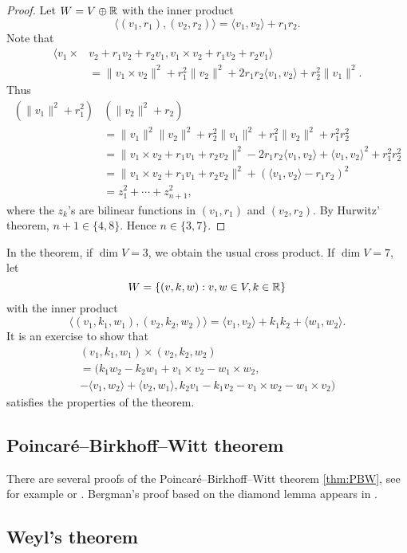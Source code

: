 \begin{proof}
	Let $W=V\oplus\mathbb{R}$ with the inner product  
	\[
		\langle (v_1,r_1),(v_2,r_2)\rangle = \langle v_1,v_2\rangle+r_1r_2.
	\]
	Note that
	\begin{align*}
		\langle v_1\times &v_2+r_1v_2+r_2v_1,v_1\times v_2+r_1v_2+r_2v_1\rangle\\
		&=\|v_1\times v_2\|^2+r_1^2\|v_2\|^2+2r_1r_2\langle v_1,v_2\rangle+r_2^2\|v_1\|^2.
	\end{align*}
	Thus  
	\begin{align*}
		(\|v_1\|^2+r_1^2)&(\|v_2\|^2+r_2)\\
		&= \|v_1\|^2\|v_2\|^2+r_2^2\|v_1\|^2+r_1^2\|v_2\|^2+r_1^2r_2^2\\
		&=\|v_1\times v_2+r_1v_1+r_2v_2\|^2-2r_1r_2\langle v_1,v_2\rangle+\langle v_1,v_2\rangle^2+r_1^2r_2^2\\
		&=\|v_1\times v_2+r_1v_1+r_2v_2\|^2+(\langle v_1,v_2\rangle-r_1r_2)^2\\
		&=z_1^2+\cdots+z_{n+1}^2,
	\end{align*}
	where the $z_k$'s are bilinear functions in $(v_1,r_1)$ and $(v_2,r_2)$. 
	By Hurwitz' theorem, 
	$n+1\in\{4,8\}$. Hence $n\in\{3,7\}$.
\end{proof}

In the theorem, if $\dim V=3$, we obtain the usual cross product. 
If $\dim V=7$, let 
\[
	W=\{(v,k,w):v,w\in V,k\in\mathbb{R}\}
\]
with the inner product 
\[
	\langle (v_1,k_1,w_1),(v_2,k_2,w_2)\rangle = \langle v_1,v_2\rangle+k_1k_2+\langle w_1,w_2\rangle.
\]
It is an exercise to show that 
\begin{multline*}
	(v_1,k_1,w_1)\times (v_2,k_2,w_2)\\
	=(k_1w_2-k_2w_1+v_1\times v_2-w_1\times w_2,
	\\-\langle v_1,w_2\rangle+\langle v_2,w_1\rangle, 
	k_2v_1-k_1v_2-v_1\times w_2-w_1\times v_2)
\end{multline*}
satisfies the properties of the theorem. 

\subsection*{Poincar\'e--Birkhoff--Witt theorem}

There are several proofs of the
Poincar\'e--Birkhoff--Witt theorem \ref{thm:PBW}, see for example 
\cite[\S17.4]{MR499562} or \cite[Theorem 2.17]{MR938524}. 
Bergman's proof based on the diamond lemma 
appears in \cite{MR506890}. 

\subsection*{Weyl's theorem}

